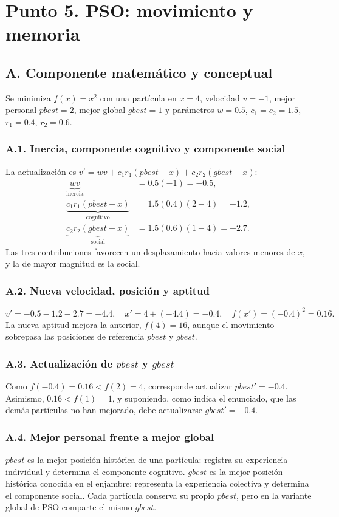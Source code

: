 \documentclass[11pt,a4paper]{article}
\begin{document}
\section{Punto 5. PSO: movimiento y memoria}
\subsection{A. Componente matemático y conceptual}
Se minimiza $f(x)=x^2$ con una partícula en $x=4$, velocidad $v=-1$, mejor personal $pbest=2$, mejor global $gbest=1$ y parámetros $w=0.5$, $c_1=c_2=1.5$, $r_1=0.4$, $r_2=0.6$.
\subsubsection{A.1. Inercia, componente cognitivo y componente social}
La actualización es $v'=wv+c_1r_1(pbest-x)+c_2r_2(gbest-x)$:
\begin{align*}
\underbrace{wv}_{\text{inercia}}&=0.5(-1)=\boxed{-0.5},\\
\underbrace{c_1r_1(pbest-x)}_{\text{cognitivo}}&=1.5(0.4)(2-4)=\boxed{-1.2},\\
\underbrace{c_2r_2(gbest-x)}_{\text{social}}&=1.5(0.6)(1-4)=\boxed{-2.7}.
\end{align*}
Las tres contribuciones favorecen un desplazamiento hacia valores menores de $x$, y la de mayor magnitud es la social.
\subsubsection{A.2. Nueva velocidad, posición y aptitud}
\[
v'=-0.5-1.2-2.7=\boxed{-4.4},\quad x'=4+(-4.4)=\boxed{-0.4},\quad f(x')=(-0.4)^2=\boxed{0.16}.
\]
La nueva aptitud mejora la anterior, $f(4)=16$, aunque el movimiento sobrepasa las posiciones de referencia $pbest$ y $gbest$.
\subsubsection{A.3. Actualización de $pbest$ y $gbest$}
Como $f(-0.4)=0.16<f(2)=4$, corresponde actualizar $pbest'=-0.4$. Asimismo, $0.16<f(1)=1$, y suponiendo, como indica el enunciado, que las demás partículas no han mejorado, debe actualizarse $gbest'=-0.4$.
\subsubsection{A.4. Mejor personal frente a mejor global}
$\mathit{pbest}$ es la mejor posición histórica de una partícula: registra su experiencia individual y determina el componente cognitivo. $\mathit{gbest}$ es la mejor posición histórica conocida en el enjambre: representa la experiencia colectiva y determina el componente social. Cada partícula conserva su propio $pbest$, pero en la variante global de PSO comparte el mismo $gbest$.
\end{document}
